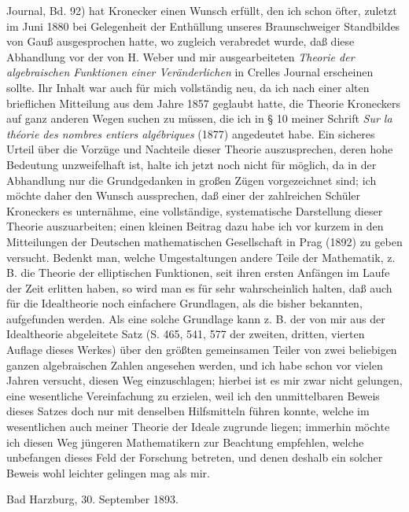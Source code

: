 \documentclass[11pt]{article}
\newcommand{\origpage}[1]{\par\vspace{0.25em}\noindent{\footnotesize\itshape [Gedruckte Seite #1]}\par\vspace{0.25em}}
\begin{document}
\origpage{427}
Journal, Bd. 92) hat Kronecker einen Wunsch erfüllt, den ich schon öfter, zuletzt im Juni 1880 bei Gelegenheit der Enthüllung unseres Braunschweiger Standbildes von Gauß ausgesprochen hatte, wo zugleich verabredet wurde, daß diese Abhandlung vor der von H. Weber und mir ausgearbeiteten \textit{Theorie der algebraischen Funktionen einer Veränderlichen} in Crelles Journal erscheinen sollte. Ihr Inhalt war auch für mich vollständig neu, da ich nach einer alten brieflichen Mitteilung aus dem Jahre 1857 geglaubt hatte, die Theorie Kroneckers auf ganz anderen Wegen suchen zu müssen, die ich in § 10 meiner Schrift \textit{Sur la théorie des nombres entiers algébriques} (1877) angedeutet habe. Ein sicheres Urteil über die Vorzüge und Nachteile dieser Theorie auszusprechen, deren hohe Bedeutung unzweifelhaft ist, halte ich jetzt noch nicht für möglich, da in der Abhandlung nur die Grundgedanken in großen Zügen vorgezeichnet sind; ich möchte daher den Wunsch aussprechen, daß einer der zahlreichen Schüler Kroneckers es unternähme, eine vollständige, systematische Darstellung dieser Theorie auszuarbeiten; einen kleinen Beitrag dazu habe ich vor kurzem in den Mitteilungen der Deutschen mathematischen Gesellschaft in Prag (1892) zu geben versucht. Bedenkt man, welche Umgestaltungen andere Teile der Mathematik, z. B. die Theorie der elliptischen Funktionen, seit ihren ersten Anfängen im Laufe der Zeit erlitten haben, so wird man es für sehr wahrscheinlich halten, daß auch für die Idealtheorie noch einfachere Grundlagen, als die bisher bekannten, aufgefunden werden. Als eine solche Grundlage kann z. B. der von mir aus der Idealtheorie abgeleitete Satz (S. 465, 541, 577 der zweiten, dritten, vierten Auflage dieses Werkes) über den größten gemeinsamen Teiler von zwei beliebigen ganzen algebraischen Zahlen angesehen werden, und ich habe schon vor vielen Jahren versucht, diesen Weg einzuschlagen; hierbei ist es mir zwar nicht gelungen, eine wesentliche Vereinfachung zu erzielen, weil ich den unmittelbaren Beweis dieses Satzes doch nur mit denselben Hilfsmitteln führen konnte, welche im wesentlichen auch meiner Theorie der Ideale zugrunde liegen; immerhin möchte ich diesen Weg jüngeren Mathematikern zur Beachtung empfehlen, welche unbefangen dieses Feld der Forschung betreten, und denen deshalb ein solcher Beweis wohl leichter gelingen mag als mir.

\begin{flushleft}Bad Harzburg, 30. September 1893.\end{flushleft}
\end{document}
